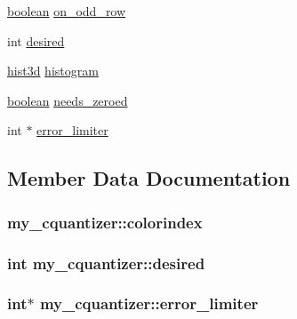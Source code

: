 \begin{DoxyCompactItemize}
\item 
\hyperlink{jmorecfg_8h_a7c6368b321bd9acd0149b030bb8275ed}{boolean} \hyperlink{structmy__cquantizer_a7745a27202b6a562461aa19ecf74638d}{on\+\_\+odd\+\_\+row}
\item 
int \hyperlink{structmy__cquantizer_aa960fa399af744fcdbf9c07ab9bd956e}{desired}
\item 
\hyperlink{jquant2_8c_ada1687f0231a8711298a8e4741e82c16}{hist3d} \hyperlink{structmy__cquantizer_a108a22411249dc52d196fa5a1ee50173}{histogram}
\item 
\hyperlink{jmorecfg_8h_a7c6368b321bd9acd0149b030bb8275ed}{boolean} \hyperlink{structmy__cquantizer_a06c9d37b470ec1e88502a32a5a73b12c}{needs\+\_\+zeroed}
\item 
int $\ast$ \hyperlink{structmy__cquantizer_a2af4df34ba2e1a9081f0dc3a661066e7}{error\+\_\+limiter}
\end{DoxyCompactItemize}


\subsection{Member Data Documentation}
\hypertarget{structmy__cquantizer_a7ec499ccdb9c6983c14edc40453ac1ed}{}
\subsubsection[{colorindex}]{ my\+\_\+cquantizer\+::colorindex}\label{structmy__cquantizer_a7ec499ccdb9c6983c14edc40453ac1ed}
\hypertarget{structmy__cquantizer_aa960fa399af744fcdbf9c07ab9bd956e}{}
\subsubsection[{desired}]{\setlength{\rightskip}{0pt plus 5cm}int my\+\_\+cquantizer\+::desired}\label{structmy__cquantizer_aa960fa399af744fcdbf9c07ab9bd956e}
\hypertarget{structmy__cquantizer_a2af4df34ba2e1a9081f0dc3a661066e7}{}
\subsubsection[{error\+\_\+limiter}]{\setlength{\rightskip}{0pt plus 5cm}int$\ast$ my\+\_\+cquantizer\+::error\+\_\+limiter}\label{structmy__cquantizer_a2af4df34ba2e1a9081f0dc3a661066e7}
\hypertarget{structmy__cquantizer_a486b351b769e8cdfc832dc33309c7069}{}
